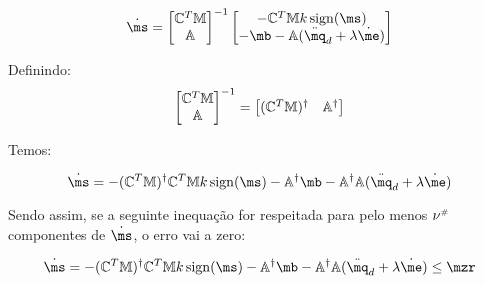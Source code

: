  $$ \dot{\ms} =  \begin{bmatrix}
\mC^T \mM \\
\mA
\end{bmatrix}^{-1}
\begin{bmatrix}
- \mC^T \mM  k  \sign (\ms) \\
-\mb - \mA(\ddot{\mq}_d  + \lambda \dot{\me})
\end{bmatrix} $$

Definindo:
$$\begin{bmatrix}
\mathbb{C}^T \mathbb{M} \\
\mathbb{A}
\end{bmatrix}^{-1}
=
\begin{bmatrix}
(\mathbb{C}^T \mathbb{M})^\dagger & \mathbb{A}^\dagger
\end{bmatrix} $$

Temos:

$$\dot{\ms} = 
- (\mC^T \mM)^\dagger \mC^T \mM  k  \sign (\ms) - \mA^\dagger\mb - \mA^\dagger \mA(\ddot{\mq}_d  + \lambda \dot{\me}) $$

Sendo assim, se a seguinte inequação for respeitada para pelo menos $\nu^{\scriptscriptstyle \#}$ componentes de $\dot{\ms}$, o erro vai a zero:

$$\dot{\ms} = 
- (\mC^T \mM)^\dagger \mC^T \mM  k  \sign (\ms) - \mA^\dagger\mb - \mA^\dagger \mA(\ddot{\mq}_d  + \lambda \dot{\me}) \leq \mzr $$